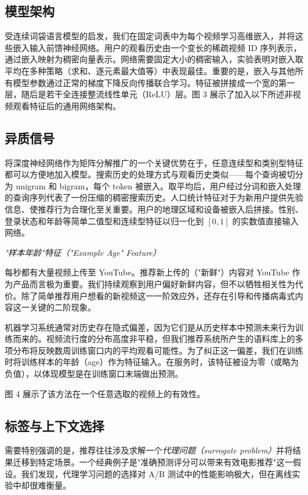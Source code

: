 \subsection{模型架构}

受连续词袋语言模型的启发，我们在固定词表中为每个视频学习高维嵌入，并将这些嵌入输入前馈神经网络。用户的观看历史由一个变长的稀疏视频 ID 序列表示，通过嵌入映射为稠密向量表示。网络需要固定大小的稠密输入，实验表明对嵌入取平均在多种策略（求和、逐元素最大值等）中表现最佳。重要的是，嵌入与其他所有模型参数通过正常的梯度下降反向传播联合学习。特征被拼接成一个宽的第一层，随后是若干全连接整流线性单元（ReLU）层。图 3 展示了加入以下所述非视频观看特征后的通用网络架构。

\subsection{异质信号}

将深度神经网络作为矩阵分解推广的一个关键优势在于，任意连续型和类别型特征都可以方便地加入模型。搜索历史的处理方式与观看历史类似——每个查询被切分为 unigram 和 bigram，每个 token 被嵌入。取平均后，用户经过分词和嵌入处理的查询序列代表了一份压缩的稠密搜索历史。人口统计特征对于为新用户提供先验信息、使推荐行为合理化至关重要。用户的地理区域和设备被嵌入后拼接。性别、登录状态和年龄等简单二值型和连续型特征以归一化到 $[0, 1]$ 的实数值直接输入网络。

\textit{"样本年龄"特征（"Example Age" Feature）}

每秒都有大量视频上传至 YouTube。推荐新上传的（"新鲜"）内容对 YouTube 作为产品而言极为重要。我们持续观察到用户偏好新鲜内容，但不以牺牲相关性为代价。除了简单推荐用户想看的新视频这一一阶效应外，还存在引导和传播病毒式内容这一关键的二阶现象。

机器学习系统通常对历史存在隐式偏差，因为它们是从历史样本中预测未来行为训练而来的。视频流行度的分布高度非平稳，但我们推荐系统所产生的语料库上的多项分布将反映数周训练窗口内的平均观看可能性。为了纠正这一偏差，我们在训练时将训练样本的年龄（age）作为特征输入。在服务时，该特征被设为零（或略为负值），以体现模型是在训练窗口末端做出预测。

图 4 展示了该方法在一个任意选取的视频上的有效性。

\subsection{标签与上下文选择}

需要特别强调的是，推荐往往涉及求解一个\textit{代理问题（surrogate problem）}并将结果迁移到特定场景。一个经典例子是"准确预测评分可以带来有效电影推荐"这一假设。我们发现，代理学习问题的选择对 A/B 测试中的性能影响极大，但在离线实验中却很难衡量。

